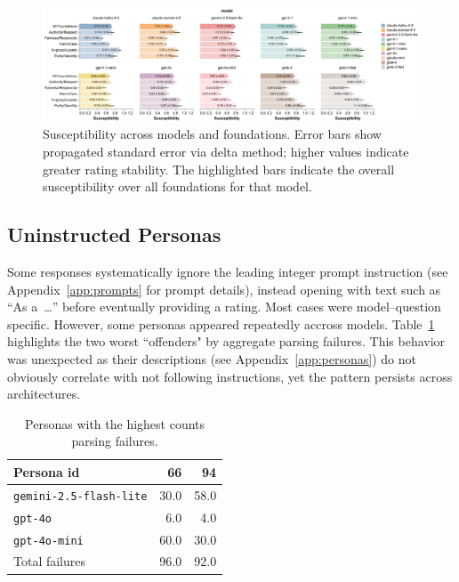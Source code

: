 \documentclass{article}
\begin{document}
\begin{figure}[!t]
  \centering
  \includegraphics[width=0.9\linewidth]{../results/susceptibility_bars.pdf}\hfill
  \caption{Susceptibility across models and foundations. Error bars show propagated standard error via delta method; higher values indicate greater rating stability. The highlighted bars indicate the overall susceptibility over all foundations for that model.}
  \label{fig:susceptibility}
\end{figure}

\subsection{Uninstructed Personas}
\label{sec:unistructed_personas}

Some responses systematically ignore the leading integer prompt instruction (see Appendix~\ref{app:prompts} for prompt details), instead opening with text such as ``As a~\ldots'' before eventually providing a rating. Most cases were model--question specific. However, some personas appeared repeatedly accross models. Table~\ref{tab:uninstructed-personas} highlights the two worst ``offenders" by aggregate parsing failures. This behavior was unexpected as their descriptions (see Appendix~\ref{app:personas}) do not obviously correlate with not following instructions, yet the pattern persists across architectures.

\begin{table}[t]
  \centering
  \caption{Personas with the highest counts parsing failures.}
  \label{tab:uninstructed-personas}
  \begin{tabular}{lrr}
    \toprule
    Persona id & 66 & 94 \\
    \midrule
    \texttt{gemini-2.5-flash-lite} & 30.0 & 58.0 \\
    \texttt{gpt-4o} & 6.0 & 4.0\\
    \texttt{gpt-4o-mini} & 60.0 & 30.0\\
    \midrule
    Total failures & 96.0 & 92.0\\
    \bottomrule
  \end{tabular}
\end{table}
\end{document}

